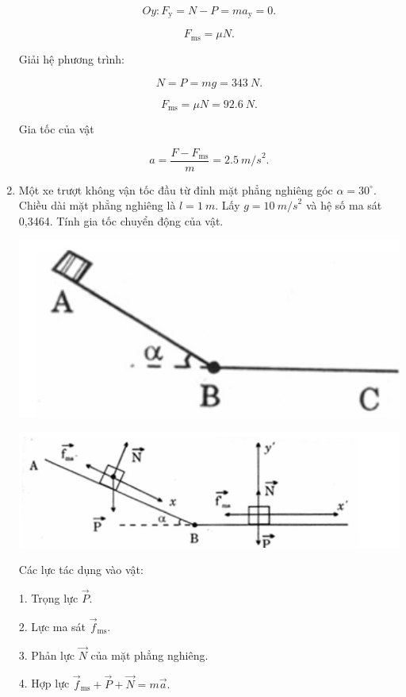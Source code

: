 \begin{enumerate}[label=\bfseries Câu \arabic*:]
{	$$Oy: F_\text{y} = N - P = ma_\text{y} = 0.$$
	
	$$F_\text{ms} = \mu N.$$
	
	Giải hệ phương trình:
	
	$$N = P = mg = \SI{343}{N}.$$
	
	$$F_\text{ms} = \mu N = \SI{92,6}{N}.$$
	
	Gia tốc của vật
	
	$$a = \dfrac{F-F_\text{ms}}{m} = \SI{2,5}{m/s}^2.$$
	}
	\item {}
	
	
	{
		Một xe trượt không vận tốc đầu từ đỉnh mặt phẳng nghiêng góc $\alpha = 30^\circ$. Chiều dài mặt phẳng nghiêng là $l = \SI{1}{m}$. Lấy $g = \SI{10}{m/s}^2$ và hệ số ma sát 0,3464. Tính gia tốc chuyển động của vật.
		
		\begin{center}
			\includegraphics[scale=0.6]{../figs/VN10-2022-PH-TP021-5.jpg}
		\end{center}
	}
	
	\hideall
	{
		\begin{center}
			\includegraphics[scale=0.6]{../figs/VN10-2022-PH-TP021-6.jpg}
		\end{center}
	Các lực tác dụng vào vật:
	
	1. Trọng lực $\vec P$.
	
	2. Lực ma sát $\vec f_\text{ms}$.
	
	3. Phản lực $\vec N$ của mặt phẳng nghiêng.
	
	4. Hợp lực $\vec f_\text{ms} + \vec P + \vec N = m\vec a.$
	
}
\end{enumerate}
